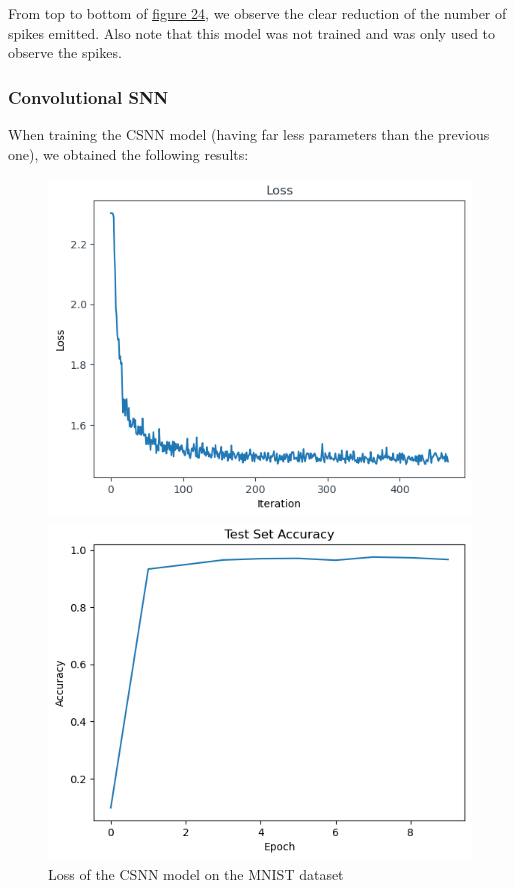 \documentclass[11pt]{article}
\begin{document}
From top to bottom of \hyperref[fig:mnist1]{figure 24}, we observe the clear reduction of the number of spikes emitted. Also note that this model was not trained and was only used to observe the spikes.

\subsubsection*{Convolutional SNN}

When training the CSNN model (having far less parameters than the previous one), we obtained the following results:

\begin{figure}[H]
  \begin{minipage}{0.5\textwidth}
    \begin{center}
      \includegraphics[width=\textwidth]{image/loss_MNIST.png}
      \caption{Loss of the CSNN model on the MNIST dataset}
      \label{fig:loss_MNIST}
    \end{center}
  \end{minipage}
  \hspace{0.5cm}
  \begin{minipage}{0.5\textwidth}
    \begin{center}
      \includegraphics[width=\textwidth]{image/accuracy_MNIST.png}

\end{center}
\end{minipage}
\end{figure}
\end{document}
